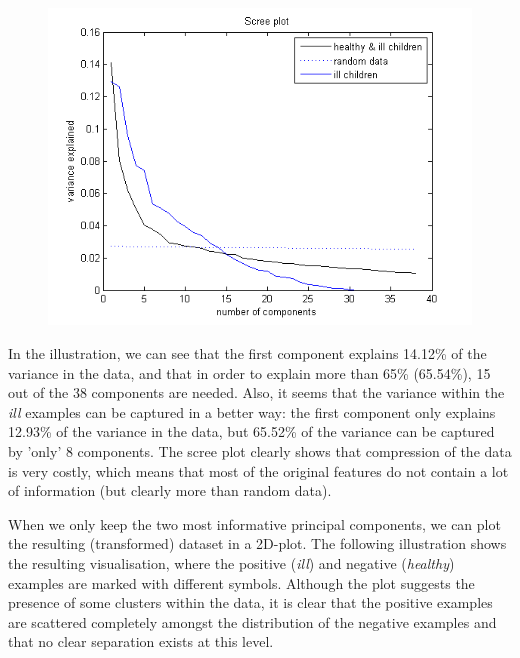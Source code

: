 \begin{figure}[h]
\includegraphics[scale=0.95]{img/pca_scree.png}
\end{figure}

In the illustration, we can see that the first component explains 14.12\% of the variance in the data, and that in order to explain more than 65\% (65.54\%), 15 out of the 38 components are needed.  Also, it seems that the variance within the \textit{ill} examples can be captured in a better way: the first component only explains 12.93\% of the variance in the data, but 65.52\% of the variance can be captured by 'only' 8 components.
The scree plot clearly shows that compression of the data is very costly, which means that most of the original features do not contain a lot of information (but clearly more than random data).

When we only keep the two most informative principal components, we can plot the resulting (transformed) dataset in a 2D-plot. The following illustration shows the resulting visualisation, where the positive (\textit{ill}) and negative (\textit{healthy}) examples are marked with different symbols. Although the plot suggests the presence of some clusters within the data, it is clear that the positive examples are scattered completely amongst the distribution of the negative examples and that no clear separation exists at this level.

